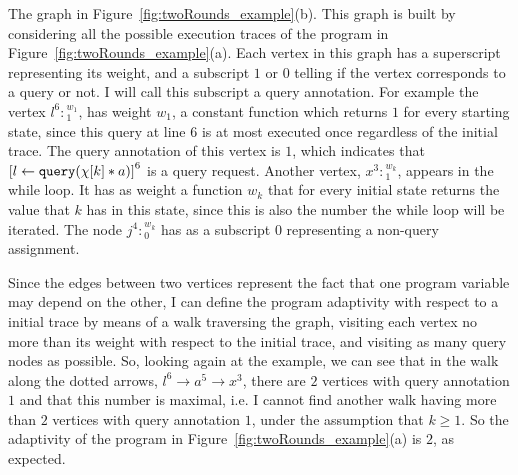 \begin{example}[twoRounds]
      The graph in Figure~\ref{fig:twoRounds_example}(b). This graph is built by considering all the possible execution traces of the program in   Figure~\ref{fig:twoRounds_example}(a).
      Each vertex in this graph has a superscript representing its weight, and a subscript $1$ or $0$ telling if the vertex corresponds to a query or not. I will call this subscript a query annotation. 
      For example the vertex $l^{6}:{}^{w_1}_1$, 
      has weight $w_1$, a constant function which returns $1$ for every starting state, since 
      this query at line $6$ is at most executed once regardless of the initial trace.
      The query annotation of this vertex is $1$, which  indicates that 
      $\clabel{\assign{l}{\query(\chi[k] * a)}}^6$ is a query request.
      Another vertex, $x^{3}:{}^{w_k}_1$, appears in the while loop. 
      It has as weight a function $w_k$ that for every initial state returns the value that $k$ has in this state, since this is also the number the while loop will be iterated. 
      The node $j^{4}:{}^{w_k}_0$ has as a subscript $0$ representing a non-query assignment.
      
      
      Since the edges between two vertices represent the fact that one program variable may depend on the other,
      I can define the program adaptivity with respect to a initial trace by means of a walk traversing the graph, visiting each vertex no more than its weight with respect to the initial trace, and visiting as many query nodes as possible.
      So, looking again at the example, we can see that
      in the walk along the dotted arrows,  $l^{6} \to a^5 \to x^3 $, there are $2$ vertices with query annotation $1$ and that this number is maximal, i.e. I cannot find another walk having more than $2$ vertices with query annotation $1$, under the assumption that $k \geq 1$. So the adaptivity of the program in Figure~\ref{fig:twoRounds_example}(a)  is $2$,
      as expected.


\end{example}
